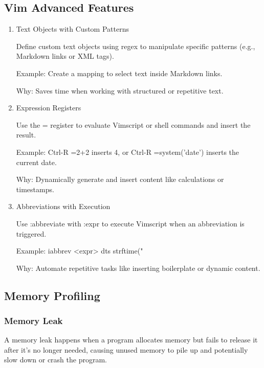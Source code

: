 \documentclass{article}
\begin{document}
\subsection{Vim Advanced Features}
\begin{enumerate}
    \item Text Objects with Custom Patterns

Define custom text objects using regex to manipulate specific patterns (e.g., Markdown links or XML tags).

Example: Create a mapping to select text inside Markdown links.

Why: Saves time when working with structured or repetitive text.

\item Expression Registers

Use the = register to evaluate Vimscript or shell commands and insert the result.

Example: Ctrl-R =2+2 inserts 4, or Ctrl-R =system('date') inserts the current date.

Why: Dynamically generate and insert content like calculations or timestamps.

\item Abbreviations with Execution

Use :abbreviate with :expr to execute Vimscript when an abbreviation is triggered.

Example: iabbrev <expr> dts strftime("%

Why: Automate repetitive tasks like inserting boilerplate or dynamic content.
\end{enumerate}

\subsection{Memory Profiling}
\subsubsection{Memory Leak}

A memory leak happens when a program allocates memory but fails to release it after it’s no longer needed, causing unused memory to pile up and potentially slow down or crash the program.
\end{document}
